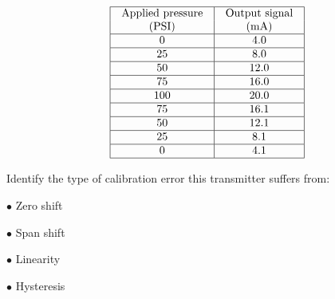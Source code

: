 
$$\vbox{\offinterlineskip
\halign{\strut
\vrule \quad\hfil # \ \hfil & 
\vrule \quad\hfil # \ \hfil \vrule \cr
\noalign{\hrule}
%
Applied pressure & Output signal \cr
%
(PSI) & (mA) \cr
%
\noalign{\hrule}
%
0 & 4.0 \cr
%
\noalign{\hrule}
%
25 & 8.0 \cr
%
\noalign{\hrule}
%
50 & 12.0 \cr
%
\noalign{\hrule}
%
75 & 16.0 \cr
%
\noalign{\hrule}
%
100 & 20.0 \cr
%
\noalign{\hrule}
%
75 & 16.1 \cr
%
\noalign{\hrule}
%
50 & 12.1 \cr
%
\noalign{\hrule}
%
25 & 8.1 \cr
%
\noalign{\hrule}
%
0 & 4.1 \cr
%
\noalign{\hrule}
} %
}$$ %

\vskip 10pt

Identify the type of calibration error this transmitter suffers from:

\medskip
\item{$\bullet$} Zero shift
\vskip 5pt 
\item{$\bullet$} Span shift
\vskip 5pt 
\item{$\bullet$} Linearity
\vskip 5pt 
\item{$\bullet$} Hysteresis
\medskip




